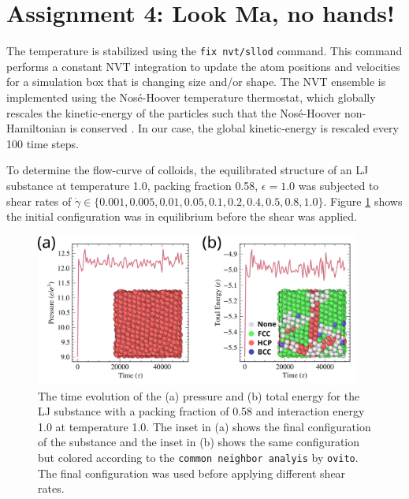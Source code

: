 \documentclass[10pt,a4paper]{labreport}
\begin{document}
\newpage
\section{Assignment 4: Look Ma, no hands!}
The temperature is stabilized using the \texttt{fix nvt/sllod} command. 
This command performs a constant NVT integration to update the atom positions and velocities for a simulation box that is changing size and/or shape. 
The NVT ensemble is implemented using the Nos\'{e}-Hoover temperature thermostat, which globally rescales the kinetic-energy of the particles such that the Nos\'{e}-Hoover non-Hamiltonian is conserved \cite{frenkelUnderstandingMolecularSimulation2023}. 
In our case, the global kinetic-energy is rescaled every 100 time steps. 

To determine the flow-curve of colloids, the equilibrated structure of an LJ substance at temperature 1.0, packing fraction 0.58, $\epsilon = 1.0$ was subjected to shear rates of $\dot{\gamma} \in \{0.001, 0.005, 0.01, 0.05, 0.1, 0.2, 0.4, 0.5, 0.8, 1.0\}$.
Figure \ref{fig:ass4_equilib} shows the initial configuration was in equilibrium before the shear was applied. 
\begin{figure}[h!]
  \centering
  \includegraphics[width = 0.95\textwidth]{figs/ass4_equilib.png}
  \caption{The time evolution of the (a) pressure and (b) total energy for the LJ substance with a packing fraction of 0.58 and interaction energy 1.0 at temperature 1.0. The inset in (a) shows the final configuration of the substance and the inset in (b) shows the same configuration but colored according to the \texttt{common neighbor analyis} by \texttt{ovito}. The final configuration was used before applying different shear rates.}
  \label{fig:ass4_equilib}
\end{figure}
\end{document}
